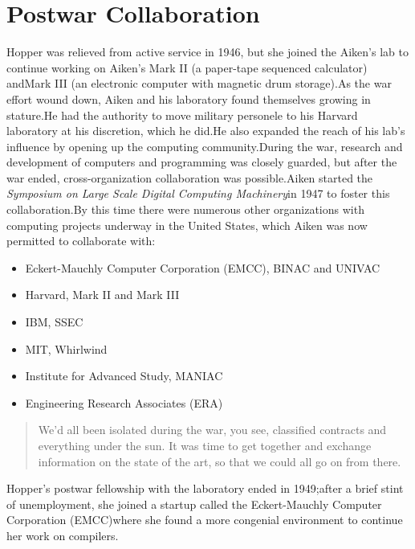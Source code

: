\section{Postwar Collaboration}

Hopper was relieved from active service in 1946, but she joined the Aiken's
lab to continue working on Aiken's Mark II (a paper-tape sequenced calculator)
andMark III (an electronic computer with magnetic drum storage).As the war
effort wound down, Aiken and his laboratory found themselves growing in
stature.He had the authority to move military personele to his Harvard
laboratory at his discretion, which he did.He also expanded the reach of his
lab's influence by opening up the computing community.During the war, research
and development of computers and programming was closely guarded, but after the
war ended, cross-organization collaboration was possible.Aiken started the
\textit{Symposium on Large Scale Digital Computing Machinery}in 1947 to foster
this collaboration.By this time there were numerous other organizations with
computing projects underway in the United States, which Aiken was now permitted
to collaborate with:

\begin{itemize}
  \item Eckert-Mauchly Computer Corporation (EMCC), BINAC and UNIVAC
  \item Harvard, Mark II and Mark III
  \item IBM, SSEC
  \item MIT, Whirlwind
  \item Institute for Advanced Study, MANIAC
  \item Engineering Research Associates (ERA)
\end{itemize}
\begin{quotation}
  We'd all been isolated during the war, you see, classified
  contracts and everything under the sun. It was time to get together
  and exchange information on the state of the art, so that we could
  all go on from there.
\end{quotation}

Hopper's postwar fellowship with the laboratory ended in 1949;after a
brief stint of unemployment, she joined a startup called the
Eckert-Mauchly Computer Corporation (EMCC)where she found a more
congenial environment to continue her work on compilers.

